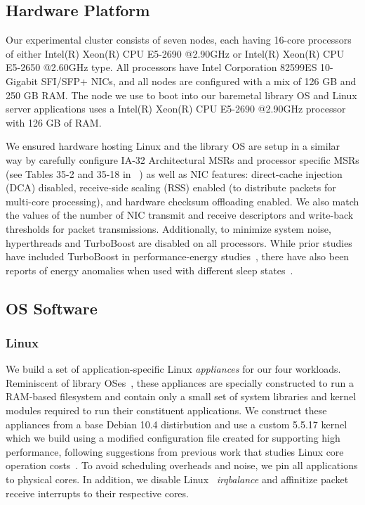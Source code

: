 \subsection{Hardware Platform}
\label{sec:exp_setup}
Our experimental cluster consists of seven nodes,
each having 16-core processors of either 
Intel(R) Xeon(R) CPU E5-2690 @2.90GHz
or Intel(R) Xeon(R) CPU E5-2650 @2.60GHz type.
All processors have Intel Corporation 82599ES 10-Gigabit SFI/SFP+ NICs,
and all nodes are configured with a mix of 126 GB and 250 GB RAM.
The node we use to boot into our baremetal library OS and Linux server applications uses a Intel(R) Xeon(R) CPU E5-2690 @2.90GHz processor with 126 GB of RAM.

We ensured hardware hosting Linux and the library OS
are setup in a similar way by carefully configure IA-32 Architectural MSRs and processor specific MSRs
(see Tables 35-2 and 35-18 in ~\cite{intel_msr})
as well as NIC features:
direct-cache injection (DCA) disabled,
receive-side scaling (RSS) enabled
(to distribute packets for multi-core processing),
and hardware checksum offloading enabled.
We also match the values of
the number of NIC transmit and receive descriptors
and write-back thresholds for packet transmissions.
Additionally, to minimize system noise, hyperthreads and TurboBoost are disabled on all processors. While prior studies have included TurboBoost in performance-energy studies~\cite{udpm, pacingtoidle, PerAppPower, ixcp}, there have also been reports of energy anomalies when used with different sleep states~\cite{slowdownorsleep}.

\subsection{OS Software}
\label{sec:OS}

\subsubsection{Linux}
\label{sec:OS_linux}
We build a set of application-specific Linux \textit{appliances} for our four workloads. Reminiscent of library OSes~\cite{unikernels}, these appliances are specially constructed to run a RAM-based filesystem and contain only a small set of system libraries and kernel modules required to run their constituent applications. We construct these appliances from a base Debian 10.4 distirbution and use a custom 5.5.17 kernel which we build using a modified configuration file created for supporting high performance, following suggestions from previous work that studies Linux core operation costs~\cite{linux-core-ops}. To avoid scheduling overheads and noise, we pin all applications to physical cores. In addition, we disable Linux ~\textit{irqbalance} and affinitize packet receive interrupts to their respective cores.

